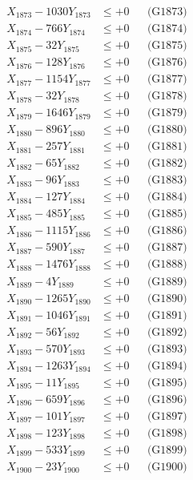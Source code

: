 \documentclass[a4paper,10pt]{article}
\begin{document}
{\begin{align}
X_{1873} - 1030Y_{1873} &\leq +0 && \text{(G1873)} \\
X_{1874} - 766Y_{1874} &\leq +0 && \text{(G1874)} \\
X_{1875} - 32Y_{1875} &\leq +0 && \text{(G1875)} \\
X_{1876} - 128Y_{1876} &\leq +0 && \text{(G1876)} \\
X_{1877} - 1154Y_{1877} &\leq +0 && \text{(G1877)} \\
X_{1878} - 32Y_{1878} &\leq +0 && \text{(G1878)} \\
X_{1879} - 1646Y_{1879} &\leq +0 && \text{(G1879)} \\
X_{1880} - 896Y_{1880} &\leq +0 && \text{(G1880)} \\
\allowbreak
X_{1881} - 257Y_{1881} &\leq +0 && \text{(G1881)} \\
X_{1882} - 65Y_{1882} &\leq +0 && \text{(G1882)} \\
X_{1883} - 96Y_{1883} &\leq +0 && \text{(G1883)} \\
X_{1884} - 127Y_{1884} &\leq +0 && \text{(G1884)} \\
X_{1885} - 485Y_{1885} &\leq +0 && \text{(G1885)} \\
X_{1886} - 1115Y_{1886} &\leq +0 && \text{(G1886)} \\
X_{1887} - 590Y_{1887} &\leq +0 && \text{(G1887)} \\
X_{1888} - 1476Y_{1888} &\leq +0 && \text{(G1888)} \\
X_{1889} - 4Y_{1889} &\leq +0 && \text{(G1889)} \\
X_{1890} - 1265Y_{1890} &\leq +0 && \text{(G1890)} \\
\allowbreak
X_{1891} - 1046Y_{1891} &\leq +0 && \text{(G1891)} \\
X_{1892} - 56Y_{1892} &\leq +0 && \text{(G1892)} \\
X_{1893} - 570Y_{1893} &\leq +0 && \text{(G1893)} \\
X_{1894} - 1263Y_{1894} &\leq +0 && \text{(G1894)} \\
X_{1895} - 11Y_{1895} &\leq +0 && \text{(G1895)} \\
X_{1896} - 659Y_{1896} &\leq +0 && \text{(G1896)} \\
X_{1897} - 101Y_{1897} &\leq +0 && \text{(G1897)} \\
X_{1898} - 123Y_{1898} &\leq +0 && \text{(G1898)} \\
X_{1899} - 533Y_{1899} &\leq +0 && \text{(G1899)} \\
X_{1900} - 23Y_{1900} &\leq +0 && \text{(G1900)} \\

\end{align}}
\end{document}
